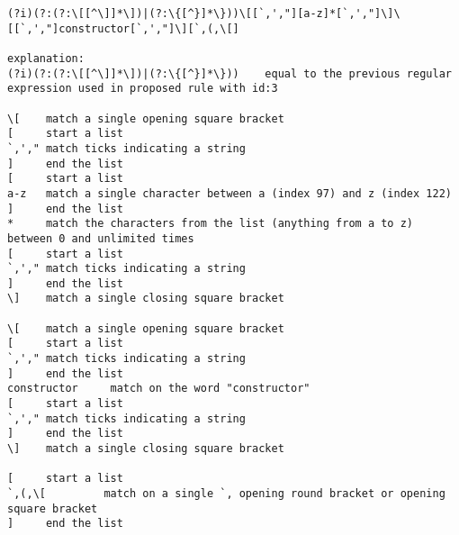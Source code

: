 \begin{lstlisting}[style=basicStyle, caption=regex of proposed rule id:3, label={lst:constructorproposalregexB}]
(?i)(?:(?:\[[^\]]*\])|(?:\{[^}]*\}))\[[`,',"][a-z]*[`,',"]\]\[[`,',"]constructor[`,',"]\][`,(,\[]

explanation:
(?i)(?:(?:\[[^\]]*\])|(?:\{[^}]*\}))    equal to the previous regular expression used in proposed rule with id:3

\[    match a single opening square bracket
[     start a list
`,'," match ticks indicating a string
]     end the list
[     start a list
a-z   match a single character between a (index 97) and z (index 122)
]     end the list
*     match the characters from the list (anything from a to z) between 0 and unlimited times
[     start a list
`,'," match ticks indicating a string
]     end the list
\]    match a single closing square bracket

\[    match a single opening square bracket
[     start a list
`,'," match ticks indicating a string
]     end the list
constructor     match on the word "constructor"
[     start a list
`,'," match ticks indicating a string
]     end the list
\]    match a single closing square bracket

[     start a list
`,(,\[         match on a single `, opening round bracket or opening square bracket
]     end the list
\end{lstlisting}


